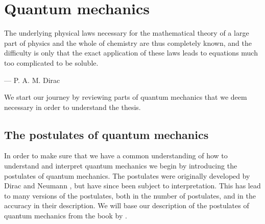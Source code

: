 \chapter{Quantum mechanics}
    \epigraph{The underlying physical laws necessary for the mathematical
    theory of a large part of physics and the whole of chemistry are thus
    completely known, and the difficulty is only that the exact application of
    these laws leads to equations much too complicated to be soluble.}
    {--- P. A. M. Dirac}

    We start our journey by reviewing parts of quantum mechanics that we deem
    necessary in order to understand the thesis.

    \section{The postulates of quantum mechanics}
        In order to make sure that we have a common understanding of how to
        understand and interpret quantum mechanics we begin by introducing the
        postulates of quantum mechanics.
        The postulates were originally developed by Dirac
        \cite{dirac1981principles} and Neumann \cite{von2018mathematical},
        but have since been subject to interpretation.
        This has lead to many versions of the postulates, both in the number of
        postulates, and in the accuracy in their description.
        We will base our description of the postulates of quantum mechanics from
        the book  by
        \citeauthor{salasnich2017quantum} \cite{salasnich2017quantum}.

